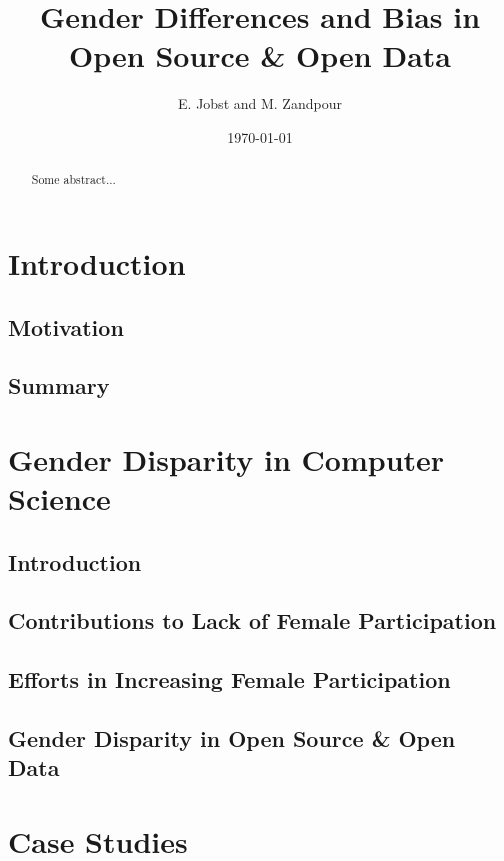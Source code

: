 \documentclass[a4paper, 11pt]{article}
\title{Gender Differences and Bias in Open Source \& Open Data}
\begin{document}
\date{\today}
\author{E. Jobst and M. Zandpour}
\maketitle

\begin{abstract}
Some abstract...
\end{abstract}

\section{Introduction} \label{sec:intro}

\subsection{Motivation} \label{sec:intro:motivation}

\subsection{Summary} \label{sec:intro:summary}

\section{Gender Disparity in Computer Science} \label{sec:gender-disparity}

\subsection{Introduction} \label{sec:gender-disparity:introduction}

\subsection{Contributions to Lack of Female Participation} \label{sec:gender-disparity:contributions}

\subsection{Efforts in Increasing Female Participation} \label{sec:gender-disparity:efforts}

\subsection{Gender Disparity in Open Source \& Open Data}

\section{Case Studies} \label{sec:casestudies}
\end{document}
